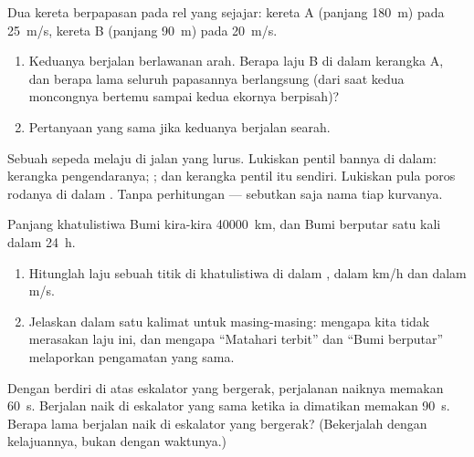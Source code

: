 \begin{exercise}[$\star\star$]\label{exo:g10:relative-motion:8}
Dua kereta berpapasan pada rel yang sejajar: kereta A (panjang
\qty{180}{m}) pada \qty{25}{m/s}, kereta B (panjang \qty{90}{m}) pada
\qty{20}{m/s}.
\begin{enumerate}
  \item Keduanya berjalan berlawanan arah. Berapa laju B di dalam
        kerangka A, dan berapa lama seluruh papasannya berlangsung
        (dari saat kedua moncongnya bertemu sampai kedua ekornya
        berpisah)?
  \item Pertanyaan yang sama jika keduanya berjalan searah.
\end{enumerate}
\end{exercise}

\begin{exercise}[$\star\star$]\label{exo:g10:relative-motion:9}
Sebuah sepeda melaju di jalan yang lurus. Lukiskan  pentil
bannya di dalam: kerangka pengendaranya; ; dan kerangka
pentil itu sendiri. Lukiskan pula  poros rodanya di dalam
. Tanpa perhitungan --- sebutkan saja nama tiap kurvanya.
\end{exercise}

\begin{exercise}[$\star\star$]\label{exo:g10:relative-motion:10}
Panjang khatulistiwa Bumi kira-kira \qty{40000}{km}, dan Bumi berputar
satu kali dalam \qty{24}{h}.
\begin{enumerate}
  \item Hitunglah laju sebuah titik di khatulistiwa di dalam , dalam \unit{km/h} dan dalam \unit{m/s}.
  \item Jelaskan dalam satu kalimat untuk masing-masing: mengapa kita
        tidak merasakan laju ini, dan mengapa ``Matahari terbit'' dan
        ``Bumi berputar'' melaporkan pengamatan yang sama.
\end{enumerate}
\end{exercise}

\begin{exercise}[$\star\star$]\label{exo:g10:relative-motion:11}
Dengan berdiri  di atas eskalator yang bergerak, perjalanan naiknya
memakan \qty{60}{s}. Berjalan naik di eskalator yang sama ketika ia
dimatikan memakan \qty{90}{s}. Berapa lama berjalan naik di eskalator
yang bergerak? (Bekerjalah dengan kelajuannya, bukan dengan waktunya.)
\end{exercise}

